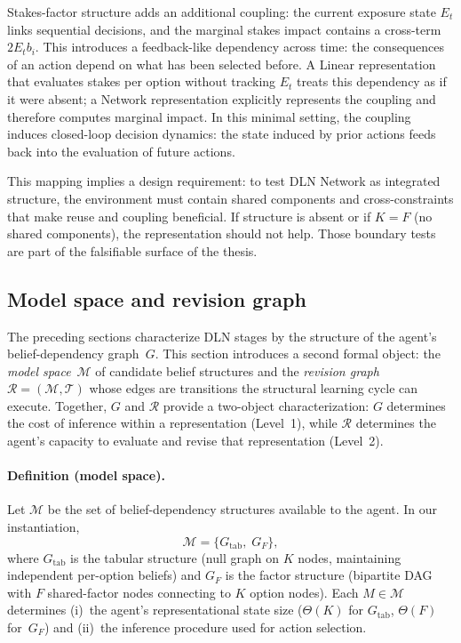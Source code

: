 \documentclass[11pt]{article}
\begin{document}
Stakes-factor structure adds an additional coupling: the current exposure state $E_t$ links sequential decisions, and the marginal stakes impact contains a cross-term $2E_tb_i$. This introduces a feedback-like dependency across time: the consequences of an action depend on what has been selected before. A Linear representation that evaluates stakes per option without tracking $E_t$ treats this dependency as if it were absent; a Network representation explicitly represents the coupling and therefore computes marginal impact. In this minimal setting, the coupling induces closed-loop decision dynamics: the state induced by prior actions feeds back into the evaluation of future actions.

This mapping implies a design requirement: to test DLN Network as integrated structure, the environment must contain shared components and cross-constraints that make reuse and coupling beneficial. If structure is absent or if $K=F$ (no shared components), the representation should not help. Those boundary tests are part of the falsifiable surface of the thesis.


\subsection{Model space and revision graph}\label{sec:model_space}

The preceding sections characterize DLN stages by the structure of the agent's
belief-dependency graph~$G$.  This section introduces a second formal object:
the \emph{model space}~$\mathcal{M}$ of candidate belief structures and the
\emph{revision graph} $\mathcal{R}=(\mathcal{M},\mathcal{T})$ whose edges are
transitions the structural learning cycle can execute.  Together, $G$ and
$\mathcal{R}$ provide a two-object characterization: $G$ determines the cost of
inference within a representation (Level~1), while $\mathcal{R}$ determines the
agent's capacity to evaluate and revise that representation (Level~2).

\paragraph{Definition (model space).}
Let $\mathcal{M}$ be the set of belief-dependency structures available to the
agent.  In our instantiation,
\[
\mathcal{M} = \bigl\{G_{\mathrm{tab}},\; G_{F}\bigr\},
\]
where $G_{\mathrm{tab}}$ is the tabular structure (null graph on $K$ nodes,
maintaining independent per-option beliefs) and $G_F$ is the factor structure
(bipartite DAG with $F$ shared-factor nodes connecting to $K$ option nodes).
Each $M \in \mathcal{M}$ determines (i)~the agent's representational state size
($\Theta(K)$ for $G_{\mathrm{tab}}$, $\Theta(F)$ for~$G_F$) and (ii)~the
inference procedure used for action selection.
\end{document}
